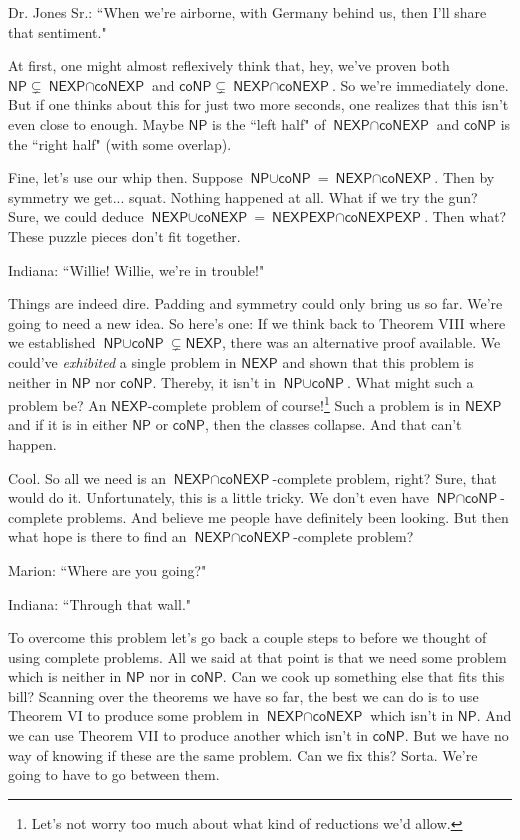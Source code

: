\documentclass{article}
\newcommand{\NP}{\ensuremath{\textsf{NP}}}
\newcommand{\NEXP}{\ensuremath{\textsf{NEXP}}}
\newcommand{\coNP}{\ensuremath{\textsf{coNP}}}
\newcommand{\interP}{\ensuremath{\textsf{NP}\cap\textsf{coNP}}}
\newcommand{\interEXP}{\ensuremath{\textsf{NEXP}\cap\textsf{coNEXP}}}
\newcommand{\interEXPEXP}{\ensuremath{\textsf{NEXPEXP}\cap\textsf{coNEXPEXP}}}
\newcommand{\unionP}{\ensuremath{\textsf{NP}\cup\textsf{coNP}}}
\newcommand{\unionEXP}{\ensuremath{\textsf{NEXP}\cup\textsf{coNEXP}}}
\begin{document}
Dr. Jones Sr.: ``When we're airborne, with Germany behind us, then I'll share that sentiment."

At first, one might almost reflexively think that, hey, we've proven both $\NP \subsetneq \interEXP$ and $\coNP \subsetneq \interEXP$. So we're immediately done. But if one thinks about this for just two more seconds, one realizes that this isn't even close to enough. Maybe $\NP$ is the ``left half" of $\interEXP$ and $\coNP$ is the ``right half" (with some overlap).

Fine, let's use our whip then. Suppose $\unionP = \interEXP$. Then by symmetry we get... squat. Nothing happened at all. What if we try the gun? Sure, we could deduce $\unionEXP = \interEXPEXP$. Then what? These puzzle pieces don't fit together.

Indiana: ``Willie! Willie, we're in trouble!"

Things are indeed dire. Padding and symmetry could only bring us so far. We're going to need a new idea. So here's one: If we think back to Theorem VIII where we established $\unionP \subsetneq \NEXP$, there was an alternative proof available. We could've \textit{exhibited} a single problem in $\NEXP$ and shown that this problem is neither in $\NP$ nor $\coNP$. Thereby, it isn't in $\unionP$. What might such a problem be? An $\NEXP$-complete problem of course!\footnote{Let's not worry too much about what kind of reductions we'd allow.} Such a problem is in $\NEXP$ and if it is in either $\NP$ or $\coNP$, then the classes collapse. And that can't happen.

Cool. So all we need is an $\interEXP$-complete problem, right? Sure, that would do it. Unfortunately, this is a little tricky. We don't even have $\interP$-complete problems. And believe me people have definitely been looking. But then what hope is there to find an $\interEXP$-complete problem?

Marion: ``Where are you going?"

Indiana: ``Through that wall."

To overcome this problem let's go back a couple steps to before we thought of using complete problems. All we said at that point is that we need some problem which is neither in $\NP$ nor in $\coNP$. Can we cook up something else that fits this bill? Scanning over the theorems we have so far, the best we can do is to use Theorem VI to produce some problem in $\interEXP$ which isn't in $\NP$. And we can use Theorem VII to produce another which isn't in $\coNP$. But we have no way of knowing if these are the same problem. Can we fix this? Sorta. We're going to have to go between them.
\end{document}
